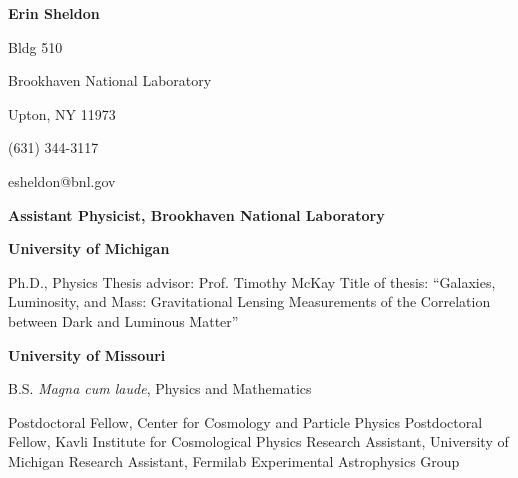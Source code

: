\documentclass[12pt]{article}
\begin{document}

\newcommand{\tsp}{\vspace{0.1cm}}
\newcommand{\isp}{\vspace{0.3cm}}
\newcommand{\ssp}{\vspace{0.4cm}}


{\Large {\bf Erin Sheldon}}
\tsp
%
%

\noindent
Bldg 510

\noindent
Brookhaven National Laboratory

\noindent
Upton, NY 11973

\noindent
(631) 344-3117

\noindent
esheldon@bnl.gov


\ssp
\ssp
\noindent
{}
{\bf Assistant Physicist, Brookhaven National Laboratory}

\hfill
{}
\normalsize




\ssp
\ssp
\noindent
{}
{\bf University of Michigan}
\hfill
{}
\normalsize

\tsp
\noindent
\makebox[1.25in][l]{}
\parbox{5.40in}{
Ph.D., Physics\newline
Thesis advisor: Prof. Timothy McKay\newline
Title of thesis: ``Galaxies, Luminosity, and Mass: Gravitational Lensing Measurements of the Correlation between Dark and Luminous Matter''
}

\isp
\noindent
\makebox[1.25in][l]{}
{\bf University of Missouri}
\hfill
{}
\normalsize

\tsp
\noindent
\makebox[1.25in][l]{}
\parbox{5.40in}{B.S. {\it Magna cum laude}, Physics and Mathematics}

%
%

\ssp
\ssp
\noindent
{}
	{Postdoctoral Fellow, Center for Cosmology and Particle Physics}
        \newline
{}
        \hfill
\newline
\makebox[1.25in][l]{}
	{Postdoctoral Fellow, Kavli Institute for Cosmological Physics}
	\newline
{}
	\hfill
\newline
\makebox[1.25in][l]{}
	{{Research Assistant, University of Michigan}}
	\hfill
\newline
\makebox[1.25in][l]{}
	{Research Assistant, Fermilab Experimental Astrophysics Group}
\end{document}
